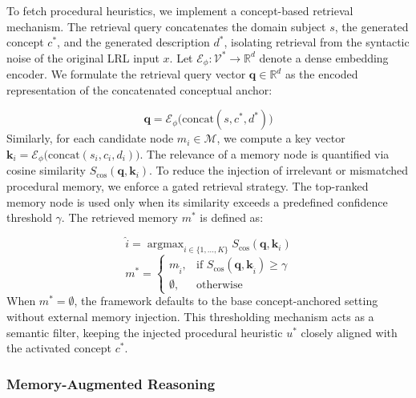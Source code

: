 \documentclass[11pt]{article}
\begin{document}
To fetch procedural heuristics, we implement a concept-based retrieval mechanism.
The retrieval query concatenates the domain subject $s$, the generated concept $c^*$, and the generated description $d^*$, isolating retrieval from the syntactic noise of the original LRL input $x$.
Let $\mathcal{E}_\phi: \mathcal{V}^* \rightarrow \mathbb{R}^d$ denote a dense embedding encoder. We formulate the retrieval query vector $\mathbf{q} \in \mathbb{R}^d$ as the encoded representation of the concatenated conceptual anchor:

\begin{equation}
    \mathbf{q} = \mathcal{E}_\phi \big( \mathrm{concat}(s, c^*, d^*) \big)
\end{equation}
Similarly, for each candidate node $m_i \in \mathcal{M}$, we compute a key vector $\mathbf{k}_i = \mathcal{E}_\phi \big( \mathrm{concat}(s_i, c_i, d_i) \big)$.
The relevance of a memory node is quantified via cosine similarity $S_{\mathrm{cos}}(\mathbf{q}, \mathbf{k}_i)$.
To reduce the injection of irrelevant or mismatched procedural memory, we enforce a gated retrieval strategy.
The top-ranked memory node is used only when its similarity exceeds a predefined confidence threshold $\gamma$. The retrieved memory $m^*$ is defined as:

\begin{equation}
    \hat{i} = \mathop{\arg\max}_{i \in \{1,\dots,K\}} S_{\mathrm{cos}}(\mathbf{q}, \mathbf{k}_i)
\end{equation}
\begin{equation}
    m^* =
    \begin{cases}
      m_{\hat{i}}, & \text{if } S_{\mathrm{cos}}(\mathbf{q}, \mathbf{k}_{\hat{i}}) \ge \gamma \\
      \emptyset, & \text{otherwise}
    \end{cases}
\end{equation}
When $m^* = \emptyset$, the framework defaults to the base concept-anchored setting without external memory injection.
This thresholding mechanism acts as a semantic filter, keeping the injected procedural heuristic $u^*$ closely aligned with the activated concept $c^*$.

\subsubsection{Memory-Augmented Reasoning}

\end{document}
